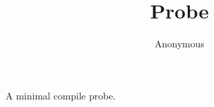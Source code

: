 \documentclass[sigconf,anonymous]{aamas}
\title{Probe}
\author{Anonymous}
\begin{document}
\maketitle
A minimal compile probe.
\end{document}

